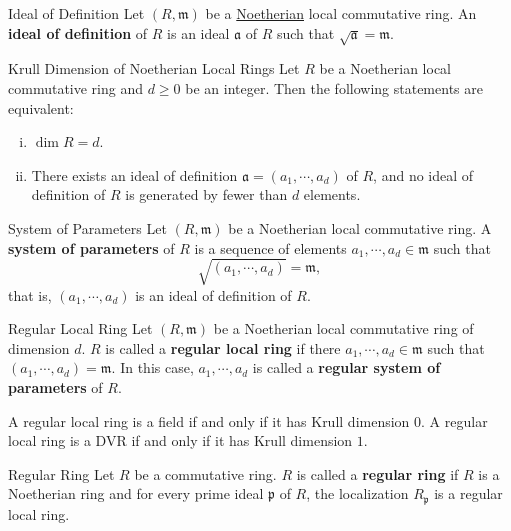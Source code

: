 \begin{definition}{Ideal of Definition}{}
Let $(R,\mathfrak{m})$ be a \hyperlink{th:Noetherian_commutative_ring}{Noetherian} local commutative ring. An \textbf{ideal of definition} of $R$ is an ideal $\mathfrak{a}$ of $R$ such that $\sqrt{\mathfrak{a}}=\mathfrak{m}$.
\end{definition}


\begin{proposition}{Krull Dimension of Noetherian Local Rings}{}
    Let $R$ be a Noetherian local commutative ring and $d\ge 0$ be an integer. Then the following statements are equivalent:
    \begin{enumerate}[(i)]
        \item $\dim R=d$.
        \item There exists an ideal of definition $\mathfrak{a}=(a_1,\cdots,a_d)$ of $R$, and no ideal of definition of $R$ is generated by fewer than $d$ elements.
    \end{enumerate}
\end{proposition}

\begin{definition}{System of Parameters}{}
    Let $(R,\mathfrak{m})$ be a Noetherian local commutative ring. A \textbf{system of parameters} of $R$ is a sequence of elements $a_1,\cdots,a_d\in \mathfrak{m}$ such that 
    \[
    \sqrt{(a_1,\cdots,a_d)}=\mathfrak{m},
    \]
    that is, $(a_1,\cdots,a_d)$ is an ideal of definition of $R$.
\end{definition}

\begin{definition}{Regular Local Ring}{}
    Let $(R,\mathfrak{m})$ be a Noetherian local commutative ring of dimension $d$. $R$ is called a \textbf{regular local ring} if there $a_1,\cdots,a_d\in \mathfrak{m}$ such that $(a_1,\cdots,a_d)=\mathfrak{m}$. In this case, $a_1,\cdots,a_d$ is called a \textbf{regular system of parameters} of $R$.
    
\end{definition}

A regular local ring is a field if and only if it has Krull dimension $0$. A regular local ring is a DVR if and only if it has Krull dimension $1$.

\begin{definition}{Regular Ring}{}
    Let $R$ be a commutative ring. $R$ is called a \textbf{regular ring} if $R$ is a Noetherian ring and for every prime ideal $\mathfrak{p}$ of $R$, the localization $R_{\mathfrak{p}}$ is a regular local ring.
    
\end{definition}


